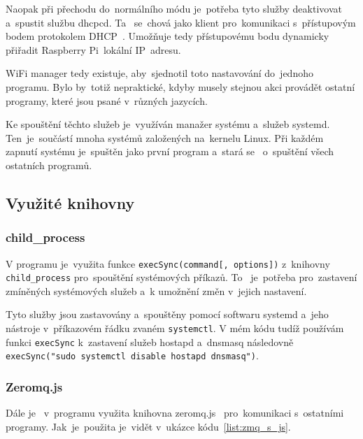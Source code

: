 Naopak při přechodu do~normálního  módu je~potřeba tyto služby deaktivovat  a~spustit službu dhcpcd. Ta ~se~chová jako klient  pro~komunikaci  s~přístupovým bodem protokolem DHCP~\cite{dhcpcd}. Umožňuje tedy přístupovému bodu dynamicky přiřadit Raspberry Pi~lokální IP~adresu.

WiFi manager tedy existuje,  aby~sjednotil toto nastavování do~jednoho programu. Bylo by~totiž nepraktické, kdyby musely stejnou akci provádět ostatní programy, které jsou psané  v~různých jazycích.

Ke spouštění těchto služeb je~využíván manažer systému  a~služeb systemd.  Ten~je~součástí mnoha systémů založených na~kernelu Linux. Při každém zapnutí systému je~spuštěn jako první program  a~stará se ~o~spuštění všech ostatních programů.~\cite{systemd}

\subsection{Využité knihovny}
\subsubsection{child\_process}
V programu je~využita funkce \texttt{execSync(command[, options])}  z~knihovny \texttt{child_process}  pro~spouštění systémových příkazů. To ~je~potřeba  pro~zastavení zmíněných systémových služeb  a~k umožnění změn  v~jejich nastavení.

Tyto služby jsou zastavovány  a~spouštěny pomocí softwaru systemd  a~jeho nástroje  v~příkazovém řádku zvaném \texttt{systemctl}.
V mém kódu tudíž používám funkci \texttt{execSync}  k~zastavení služeb hostapd  a~dnsmasq následovně \texttt{execSync("sudo systemctl disable hostapd dnsmasq")}.

\subsubsection{Zeromq.js}
Dále je ~v~programu využita knihovna zeromq.js~\cite{zeromqjs}  pro~komunikaci  s~ostatními programy.  Jak~je~použita  je~vidět  v~ukázce kódu~\ref{list:zmq_s_js}.

\begin{code}
  \inputminted[frame=lines,fontsize=\footnotesize{}, linenos, breaklines]{js}{code_examples/zmq_server.js}
\end{code}

